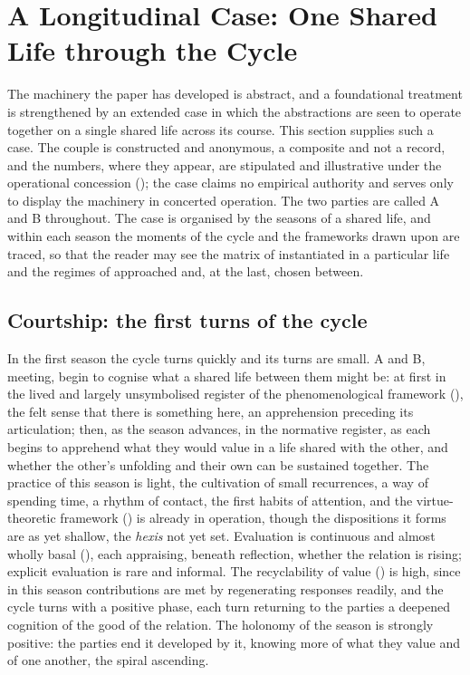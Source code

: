 \section{A Longitudinal Case: One Shared Life through the Cycle}
\label{p11:sec:case}

\noindent
The machinery the paper has developed is abstract, and a foundational treatment is strengthened by an extended case in which the abstractions are seen to operate together on a single shared life across its course. This section supplies such a case. The couple is constructed and anonymous, a composite and not a record, and the numbers, where they appear, are stipulated and illustrative under the operational concession (); the case claims no empirical authority and serves only to display the machinery in concerted operation. The two parties are called A and B throughout. The case is organised by the seasons of a shared life, and within each season the moments of the cycle and the frameworks drawn upon are traced, so that the reader may see the matrix of  instantiated in a particular life and the regimes of  approached and, at the last, chosen between.

\subsection{Courtship: the first turns of the cycle}
\label{p11:sec:case-courtship}

In the first season the cycle turns quickly and its turns are small. A and B, meeting, begin to cognise what a shared life between them might be: at first in the lived and largely unsymbolised register of the phenomenological framework (), the felt sense that there is something here, an apprehension preceding its articulation; then, as the season advances, in the normative register, as each begins to apprehend what they would value in a life shared with the other, and whether the other's unfolding and their own can be sustained together. The practice of this season is light, the cultivation of small recurrences, a way of spending time, a rhythm of contact, the first habits of attention, and the virtue-theoretic framework () is already in operation, though the dispositions it forms are as yet shallow, the \emph{hexis} not yet set. Evaluation is continuous and almost wholly basal (), each appraising, beneath reflection, whether the relation is rising; explicit evaluation is rare and informal. The recyclability of value () is high, since in this season contributions are met by regenerating responses readily, and the cycle turns with a positive phase, each turn returning to the parties a deepened cognition of the good of the relation. The holonomy of the season is strongly positive: the parties end it developed by it, knowing more of what they value and of one another, the spiral ascending.

